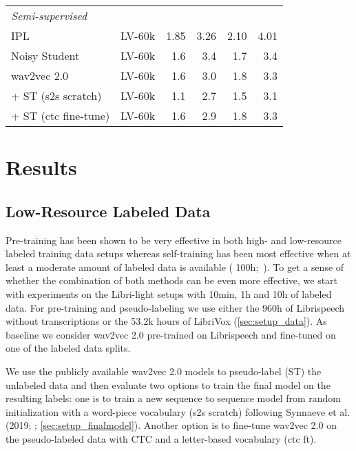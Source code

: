\documentclass{article}
\newcommand{\wvpp}{wav2vec 2.0}
\newcommand{\vox}{LibriVox}
\newcommand{\libri}{Librispeech}
\newcommand{\libril}{Libri-light}
\newcommand{\voxsz}{LV-60k}
\begin{document}
\begin{table}[t]
\begin{tabular}{lcrrrr}
\midrule
\multicolumn{5}{l}{\emph{Semi-supervised}} \\
IPL~\cite{xu2020iterative} & \voxsz{} &  1.85 &  3.26 &  2.10 &  4.01 \\
Noisy Student~\cite{park2020improved} & \voxsz{} & 1.6 &  3.4 &  1.7 &  3.4 \\
wav2vec 2.0~\cite{baevski2020wav} & \voxsz{} & 1.6 & 3.0 & 1.8 & 3.3 \\
\hspace{0.04in}+ ST (s2s scratch) & \voxsz{} & 1.1	& 2.7	& 1.5	& 3.1 \\
\hspace{0.04in}+ ST (ctc fine-tune) & \voxsz{} & 1.6 & 2.9 & 1.8 & 3.3 \\
\bottomrule
\end{tabular}
\end{table}


\section{Results}
\label{sec:results}

\subsection{Low-Resource Labeled Data}
\label{sec:libri}

Pre-training has been shown to be very effective in both high- and low-resource labeled training data setups whereas self-training has been most effective when at least a moderate amount of labeled data is available ( 100h;~\cite{xu2020iterative,park2020improved}).
To get a sense of whether the combination of both methods can be even more effective, we start with experiments on the \libril{} setups with 10min, 1h and 10h of labeled data. 
For pre-training and pseudo-labeling we use either the 960h of \libri{} without transcriptions or the 53.2k hours of \vox{} (\autoref{sec:setup_data}).
As baseline we consider \wvpp{} pre-trained on \libri{} and fine-tuned on one of the labeled data splits.

We use the publicly available \wvpp{} models to pseudo-label (ST) the unlabeled data and
then evaluate two options to train the final model on the resulting labels:
one is to train a new sequence to sequence model from random initialization with a word-piece vocabulary (s2s scratch) following Synnaeve et al. (2019; \cite{synnaeve2019end}; \autoref{sec:setup_finalmodel}). 
Another option is to fine-tune \wvpp{} on the pseudo-labeled data with CTC and a letter-based vocabulary (ctc ft).
\end{document}
